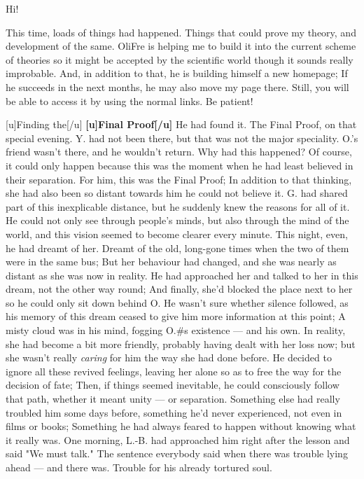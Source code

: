Hi! 

This time, loads of things had happened. Things that could prove my theory, and development of the same. OliFre is helping me to build it into the current scheme of theories so it might be accepted by the scientific world though it sounds really improbable. 
And, in addition to that, he is building himself a new homepage; If he succeeds in the next months, he may also move my page there. Still, you will be able to access it by using the normal links. Be patient! 

[u]Finding the[/u]
\textbf{[u]Final Proof[/u]}
He had found it. 
The Final Proof, on that special evening. 
Y. had not been there, but that was not the major speciality. 
O.'s friend wasn't there, and he wouldn't return. Why had this happened? Of course, it could only happen because this was the moment when he had least believed in their separation. For him, this was the Final Proof; In addition to that thinking, she had also been so distant towards him he could not believe it. G. had shared part of this inexplicable distance, but he suddenly knew the reasons for all of it. He could not only see through people's minds, but also through the mind of the world, and this vision seemed to become clearer every minute. 
This night, even, he had dreamt of her. Dreamt of the old, long-gone times when the two of them were in the same bus; But her behaviour had changed, and she was nearly as distant as she was now in reality. He had approached her and talked to her in this dream, not the other way round; And finally, she'd blocked the place next to her so he could only sit down behind O. He wasn't sure whether silence followed, as his memory of this dream ceased to give him more information at this point; A misty cloud was in his mind, fogging O.#s existence --- and his own. 
In reality, she had become a bit more friendly, probably having dealt with her loss now; but she wasn't really \emph{caring} for him the way she had done before. 
He decided to ignore all these revived feelings, leaving her alone so as to free the way for the decision of fate; Then, if things seemed inevitable, he could consciously follow that path, whether it meant unity --- or separation. 
Something else had really troubled him some days before, something he'd never experienced, not even in films or books; Something he had always feared to happen without knowing what it really was. 
One morning, L.-B. had approached him right after the lesson and said "We must talk." The sentence everybody said when there was trouble lying ahead --- and there was. Trouble for his already tortured soul. 
